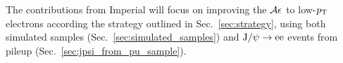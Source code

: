 The contributions from Imperial will focus on improving the $\mathcal{A}\epsilon$ to
low-$p_\mathrm{T}$ electrons according the strategy outlined in
Sec.~\ref{sec:strategy}, using both simulated samples
(Sec.~\ref{sec:simulated_samples}) and $\mathrm{J/}\psi\to\mathrm{ee}$ events from pileup
(Sec.~\ref{sec:jpsi_from_pu_sample}).


